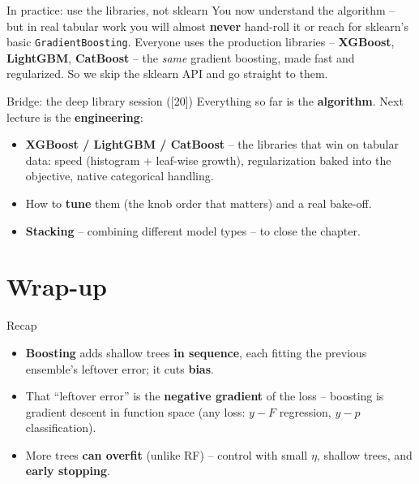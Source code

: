 \documentclass[aspectratio=169]{beamer}
\begin{document}
\begin{frame}{In practice: use the libraries, not sklearn}
  You now understand the algorithm -- but in real tabular work you will almost \textbf{never}
  hand-roll it or reach for sklearn's basic \texttt{GradientBoosting}.
  \vfill
  Everyone uses the production libraries -- \textbf{XGBoost}, \textbf{LightGBM},
  \textbf{CatBoost} -- the \emph{same} gradient boosting, made fast and regularized. So we skip
  the sklearn API and go straight to them.
  \vfill
\end{frame}

\begin{frame}{Bridge: the deep library session ([20])}
  Everything so far is the \textbf{algorithm}. Next lecture is the \textbf{engineering}:
  \begin{itemize}\small
    \item \textbf{XGBoost / LightGBM / CatBoost} -- the libraries that win on tabular data:
      speed (histogram + leaf-wise growth), regularization baked into the objective,
      native categorical handling.
    \item How to \textbf{tune} them (the knob order that matters) and a real bake-off.
    \item \textbf{Stacking} -- combining different model types -- to close the chapter.
  \end{itemize}
  \vfill
\end{frame}

\section*{Wrap-up}

\begin{frame}{Recap}
  \begin{itemize}\small
    \item \textbf{Boosting} adds shallow trees \textbf{in sequence}, each fitting the
      previous ensemble's leftover error; it cuts \textbf{bias}.
    \item That ``leftover error'' is the \textbf{negative gradient} of the loss -- boosting
      is gradient descent in function space (any loss: $y - F$ regression, $y - p$
      classification).
    \item More trees \textbf{can overfit} (unlike RF) -- control with small $\eta$,
      shallow trees, and \textbf{early stopping}.
  \end{itemize}
  \vfill
\end{frame}
\end{document}
